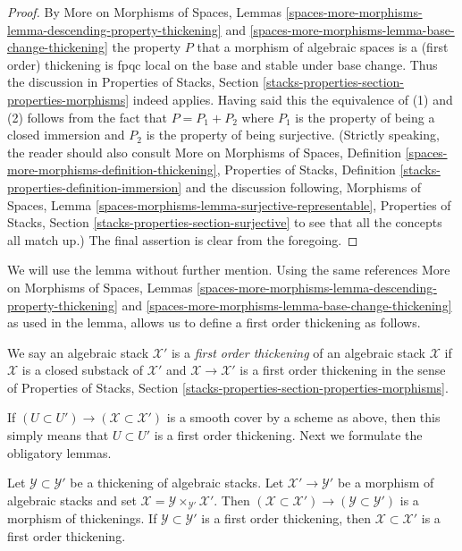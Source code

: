 \begin{proof}
By More on Morphisms of Spaces, Lemmas
\ref{spaces-more-morphisms-lemma-descending-property-thickening} and
\ref{spaces-more-morphisms-lemma-base-change-thickening}
the property $P$ that a morphism of algebraic spaces is a
(first order) thickening is fpqc local on the base and stable under base
change. Thus the discussion in Properties of Stacks, Section
\ref{stacks-properties-section-properties-morphisms} indeed applies.
Having said this the equivalence of (1) and (2) follows from
the fact that $P = P_1 + P_2$ where $P_1$ is the property of being
a closed immersion and $P_2$ is the property of being surjective.
(Strictly speaking, the reader should also consult
More on Morphisms of Spaces, Definition
\ref{spaces-more-morphisms-definition-thickening},
Properties of Stacks, Definition \ref{stacks-properties-definition-immersion}
and the discussion following, Morphisms of Spaces, Lemma
\ref{spaces-morphisms-lemma-surjective-representable},
Properties of Stacks, Section \ref{stacks-properties-section-surjective}
to see that all the concepts all match up.)
The final assertion is clear from the foregoing.
\end{proof}

\noindent
We will use the lemma without further mention. Using the same references
More on Morphisms of Spaces, Lemmas
\ref{spaces-more-morphisms-lemma-descending-property-thickening} and
\ref{spaces-more-morphisms-lemma-base-change-thickening}
as used in the lemma, allows us to define a first order thickening as follows.

\begin{definition}
\label{definition-first-order-thickening}
We say an algebraic stack $\mathcal{X}'$ is a {\it first order thickening}
of an algebraic stack $\mathcal{X}$ if $\mathcal{X}$ is a closed substack
of $\mathcal{X}'$ and $\mathcal{X} \to \mathcal{X}'$ is a first order
thickening in the sense of Properties of Stacks, Section
\ref{stacks-properties-section-properties-morphisms}.
\end{definition}

\noindent
If $(U \subset U') \to (\mathcal{X} \subset \mathcal{X}')$ is a smooth
cover by a scheme as above, then this simply means that $U \subset U'$
is a first order thickening. Next we formulate the obligatory lemmas.

\begin{lemma}
\label{lemma-base-change-thickening}
Let $\mathcal{Y} \subset \mathcal{Y}'$ be a thickening of algebraic stacks.
Let $\mathcal{X}' \to \mathcal{Y}'$ be a morphism of algebraic stacks
and set $\mathcal{X} = \mathcal{Y} \times_{\mathcal{Y}'} \mathcal{X}'$.
Then
$(\mathcal{X} \subset \mathcal{X}') \to (\mathcal{Y} \subset \mathcal{Y}')$
is a morphism of thickenings. If $\mathcal{Y} \subset \mathcal{Y}'$ is a first
order thickening, then $\mathcal{X} \subset \mathcal{X}'$ is a first
order thickening.
\end{lemma}

